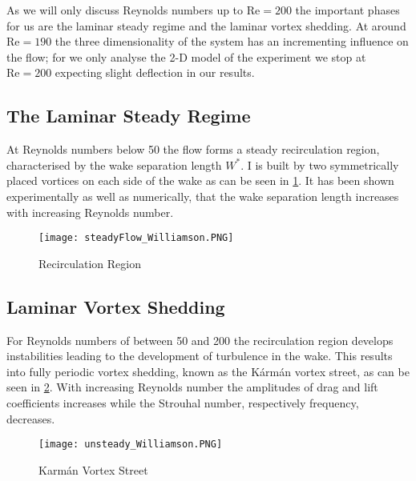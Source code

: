 	As we will only discuss Reynolds numbers up to $\text{Re} = 200$ the important phases for us are the laminar steady regime and the laminar vortex shedding. At around $\text{Re} = 190$ the three dimensionality of the system has an incrementing influence on the flow; for we only analyse the 2-D model of the experiment we stop at $\text{Re} = 200$ expecting slight deflection in our results.
	
	\subsection{The Laminar Steady Regime}
	
	At Reynolds numbers below 50 the flow forms a steady recirculation region, characterised by the wake separation length  $W^*$. I is built by two symmetrically placed vortices on each side of the wake as can be seen in \ref{fig:steady}. It has been shown experimentally as well as numerically, that the wake separation length increases with increasing Reynolds number. 
		\begin{figure}[htp]
			\centering
			\texttt{[image: steadyFlow\_Williamson.PNG]}
			\caption{Recirculation Region \cite{williamson1996vortex}}
			\label{fig:steady}
		\end{figure}
	\subsection{Laminar Vortex Shedding}
	For Reynolds numbers of between 50 and 200 the recirculation region develops instabilities leading to the development of turbulence in the wake. This results into fully periodic vortex shedding, known as the Kármán vortex street, as can be seen in \ref{fig:unsteady}. With increasing Reynolds number the amplitudes of drag and lift coefficients increases while the Strouhal number, respectively frequency, decreases.
	
		\begin{figure}[htp]
			\centering
			\texttt{[image: unsteady\_Williamson.PNG]}
			\caption{Karmán Vortex Street \cite{williamson1996vortex}}
			\label{fig:unsteady}
		\end{figure}
		
